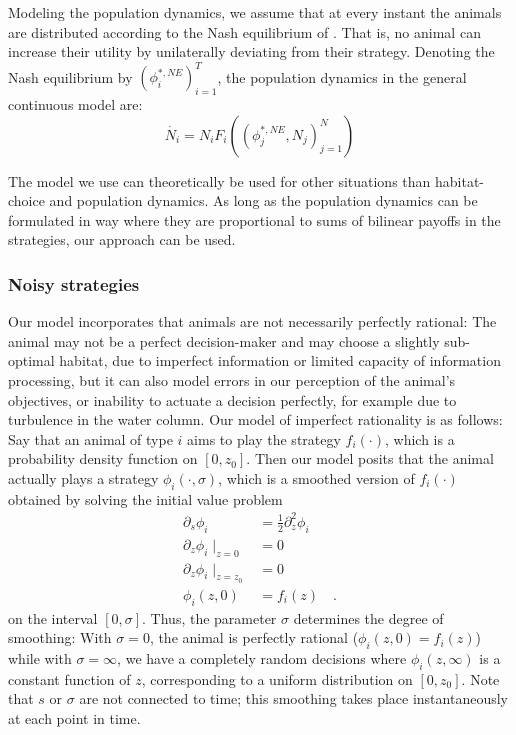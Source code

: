 Modeling the population dynamics, we assume that at every instant the animals are distributed according to the Nash equilibrium of . That is, no animal can increase their utility by unilaterally deviating from their strategy. Denoting the Nash equilibrium by $(\phi_i^{*,NE})^T_{i=1}$, the population dynamics in the general continuous model are:
\begin{equation}
  \dot{N_i} = N_i F_i((\phi_j^{*,NE},N_j)_{j=1}^N)
\end{equation}

The model we use can theoretically be used for other situations than habitat-choice and population dynamics. As long as the population dynamics can be formulated in way where they are proportional to sums of bilinear payoffs in the strategies, our approach can be used.



\subsubsection{Noisy strategies}
Our model incorporates that animals are not necessarily perfectly rational: The animal may not be a perfect decision-maker and may choose a slightly sub-optimal habitat, due to imperfect information or limited capacity of information processing, but it can also model errors in our perception of the animal's objectives, or inability to actuate a decision perfectly, for example due to turbulence in the water column. Our model of imperfect rationality is as follows: Say that an animal of type $i$ aims to play the strategy $f_i(\cdot)$, which is a probability density function on $[0,z_0]$. Then our model posits that the animal actually plays a strategy $\phi_i(\cdot ,\sigma)$, which is a smoothed version of $f_i(\cdot)$ obtained by solving the initial value problem
\begin{equation}
  \begin{split}
  \label{eq:density_PDE}
  \partial_s \phi_i &= \frac{1}{2}\partial_z^2 \phi_i \\
  \partial_z \phi_i \mid_{z=0} &= 0 \\
  \partial_z \phi_i \mid_{z = z_0} &= 0 \\
   \phi_i(z,0) &= f_i(z) \quad .
 \end{split}
\end{equation}
on the interval $[0,\sigma]$. Thus, the parameter $\sigma$ determines the degree of smoothing: With $\sigma=0$, the animal is perfectly rational ($\phi_i(z,0)=f_i(z)$) while with $\sigma=\infty$, we have a completely random decisions where $\phi_i(z,\infty)$ is a constant function of $z$, corresponding to a uniform distribution on $[0,z_0]$. Note that $s$ or $\sigma$ are not connected to time; this smoothing takes place instantaneously at each point in time.

